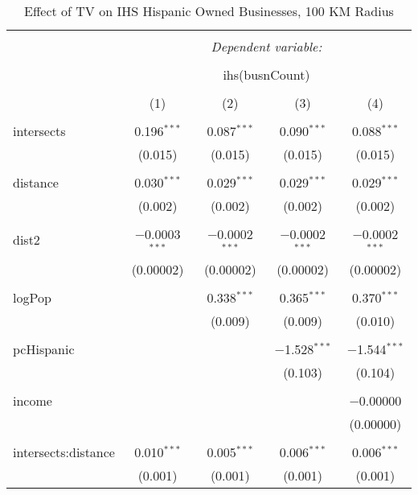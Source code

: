 
\begin{table}[!htbp] \centering 
  \caption{Effect of TV on IHS Hispanic Owned Businesses, 100 KM Radius} 
  \label{} 
\begin{tabular}{@{\extracolsep{-5pt}}lcccc} 
\\[-1.8ex]\hline 
\hline \\[-1.8ex] 
 & \multicolumn{4}{c}{\textit{Dependent variable:}} \\ 
\cline{2-5} 
\\[-1.8ex] & \multicolumn{4}{c}{ihs(busnCount)} \\ 
\\[-1.8ex] & (1) & (2) & (3) & (4)\\ 
\hline \\[-1.8ex] 
 intersects & 0.196$^{***}$ & 0.087$^{***}$ & 0.090$^{***}$ & 0.088$^{***}$ \\ 
  & (0.015) & (0.015) & (0.015) & (0.015) \\ 
  & & & & \\ 
 distance & 0.030$^{***}$ & 0.029$^{***}$ & 0.029$^{***}$ & 0.029$^{***}$ \\ 
  & (0.002) & (0.002) & (0.002) & (0.002) \\ 
  & & & & \\ 
 dist2 & $-$0.0003$^{***}$ & $-$0.0002$^{***}$ & $-$0.0002$^{***}$ & $-$0.0002$^{***}$ \\ 
  & (0.00002) & (0.00002) & (0.00002) & (0.00002) \\ 
  & & & & \\ 
 logPop &  & 0.338$^{***}$ & 0.365$^{***}$ & 0.370$^{***}$ \\ 
  &  & (0.009) & (0.009) & (0.010) \\ 
  & & & & \\ 
 pcHispanic &  &  & $-$1.528$^{***}$ & $-$1.544$^{***}$ \\ 
  &  &  & (0.103) & (0.104) \\ 
  & & & & \\ 
 income &  &  &  & $-$0.00000 \\ 
  &  &  &  & (0.00000) \\ 
  & & & & \\ 
 intersects:distance & 0.010$^{***}$ & 0.005$^{***}$ & 0.006$^{***}$ & 0.006$^{***}$ \\ 
  & (0.001) & (0.001) & (0.001) & (0.001) \\ 

\end{tabular}
\end{table}
